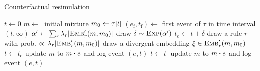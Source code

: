 \newcommand{\EVF}[0]{e_{\text{f}}}
\newcommand{\EVCF}[0]{e_{\text{c}}}

\renewcommand{\algorithmicrequire}{\textbf{Input:}}
\renewcommand{\algorithmicensure}{\textbf{Output:}}

\begin{algorithm}[h]
\caption{Counterfactual resimulation}\label{alg:cosimulation}
\begin{spacing}{1.3}
\begin{algorithmic}[1]
\vspace{0.2cm}
\STATE $t \gets 0$
\STATE $m \gets\ $ initial mixture
  \STATE $m_0 \gets \TSTATE{t}{\tau}$
  \STATE $(\EVF{}, t_{\text{f}}) \gets $ first event of $\tau$ in time interval $(t, \infty)$
  \vspace{0.1cm}
  \STATE $\alpha' \gets \sum_r {\lambda_r |{\textsc{Emb}}'_{r}(m, m_0)|}$
  \vspace{0.1cm}
  \STATE draw $\delta \sim \textsc{Exp}(\alpha') $
  \STATE $t_{\text{c}} \gets t + \delta$
   \label{cosim:cev}
      \STATE draw a rule $r$ with prob.
      $\propto \, \lambda_r |{\textsc{Emb}}'_{r}(m, m_0)|$
      \STATE  draw a divergent embedding $\xi \in {\textsc{Emb}}'_{r}(m, m_0)$
          \STATE $t \gets t_{\text{c}}$
          \STATE update $m$ to $\UPDATE{m}{e}$ and log event $(e, t)$
      \ENDIF
  \ELSE
      \STATE {$e \gets \EVF{}$}
      \STATE $t \gets t_{\text{f}}$
          \STATE update $m$ to $\UPDATE{m}{e}$ and log event $(e, t)$
      
      \ENDIF 
  \ENDIF
\ENDWHILE
\vspace{0.1cm}
\end{algorithmic}
\end{spacing}
\end{algorithm}